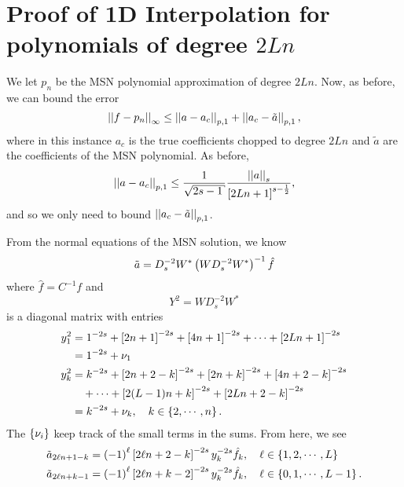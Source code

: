 \section{Proof of 1D Interpolation for polynomials of degree $2Ln$}
\label{sec:cvip_interp_1D_2Ln}

We let $p_{n}$ be the MSN polynomial approximation of degree $2Ln$.
Now, as before, we can bound the error
%
\begin{equation}
    \left| \left| f-p_{n} \right| \right|_{\infty} \le \left| \left| a-a_{c} \right| \right|_{p,1}
        + \left| \left| a_{c}-\tilde{a} \right| \right|_{p,1},
\end{equation}
%
where in this instance $a_{c}$ is the true coefficients chopped to degree
$2Ln$ and $\tilde{a}$ are the coefficients of the MSN polynomial.
As before,
%
\begin{equation}
    \norm{a-a_{c}}_{p,1} \le \frac{1}{\sqrt{2s-1}}\frac{\norm{a}_{s}}{
        \brackets{2Ln+1}^{s-\frac{1}{2}}},
\end{equation}
%
and so we only need to bound $\left| \left| a_{c}-\tilde{a} \right| \right|_{p,1}$.

From the normal equations of the MSN solution, we know
%
\begin{equation}
    \tilde{a} = D_{s}^{-2}W^{*}\left( WD_{s}^{-2}W^{*} \right)^{-1}\hat{f}
\end{equation}
%
where $\hat{f} = C^{-1}f$ and
%
\begin{equation}
    Y^{2} = WD_{s}^{-2}W^{*}
\end{equation}
%
is a diagonal matrix with entries
%
\begin{align}
    y_{1}^{2} &= 1^{-2s} + \left[ 2n+1 \right]^{-2s} + \left[ 4n+1 \right]^{-2s}
        + \cdots + \left[ 2Ln+1 \right]^{-2s} \nonumber\\
        &= 1^{-2s} + \nu_{1} \nonumber\\
    y_{k}^{2} &= k^{-2s} + \left[ 2n+2-k \right]^{-2s} + \left[ 2n+k \right]^{-2s}
        + \left[ 4n+2-k \right]^{-2s} \nonumber\\
        &\quad + \cdots + \left[ 2(L-1)n+k \right]^{-2s} + \left[ 2Ln+2-k \right]^{-2s}
            \nonumber\\
    &= k^{-2s} + \nu_{k}, \quad k\in\left\{ 2,\cdots,n \right\}.
\end{align}
%
The $\left\{ \nu_{i} \right\}$ keep track of the small terms in the sums.
From here, we see
%
\begin{align}
    \tilde{a}_{2\ell n+1-k} &= \left( -1 \right)^{\ell}\left[ 2\ell n+2-k \right]^{-2s}
        y_{k}^{-2s}\hat{f}_{k}, \quad \ell\in\left\{ 1,2,\cdots,L \right\} \nonumber\\
    \tilde{a}_{2\ell n+k-1} &= \left( -1 \right)^{\ell}\left[ 2\ell n+k-2 \right]^{-2s}
        y_{k}^{-2s}\hat{f}_{k}, \quad \ell\in\left\{ 0,1,\cdots,L-1 \right\}.
\end{align}

